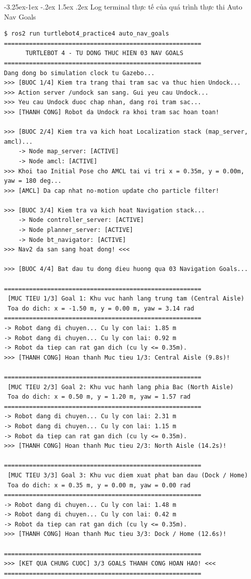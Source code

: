 \documentclass[11pt,a4paper]{article}
\makeatletter
\renewcommand{\subsection}{\@startsection{subsection}{2}{\z@}%
  {-3.25ex\@plus -1ex \@minus -.2ex}%
  {1.5ex \@plus .2ex}%
  {\normalfont\large\bfseries\color{secondary}}}
\makeatother
\begin{document}
\subsection{Log terminal thực tế của quá trình thực thi Auto Nav Goals}
\begin{lstlisting}[backgroundcolor=\color{logbg}, caption={Log terminal thực tế quá trình tự hành qua 03 Navigation Goals}]
$ ros2 run turtlebot4_practice4 auto_nav_goals
=======================================================
      TURTLEBOT 4 - TU DONG THUC HIEN 03 NAV GOALS     
=======================================================
Dang dong bo simulation clock tu Gazebo...
>>> [BUOC 1/4] Kiem tra trang thai tram sac va thuc hien Undock...
>>> Action server /undock san sang. Gui yeu cau Undock...
>>> Yeu cau Undock duoc chap nhan, dang roi tram sac...
>>> [THANH CONG] Robot da Undock ra khoi tram sac hoan toan!

>>> [BUOC 2/4] Kiem tra va kich hoat Localization stack (map_server, amcl)...
    -> Node map_server: [ACTIVE]
    -> Node amcl: [ACTIVE]
>>> Khoi tao Initial Pose cho AMCL tai vi tri x = 0.35m, y = 0.00m, yaw = 180 deg...
>>> [AMCL] Da cap nhat no-motion update cho particle filter!

>>> [BUOC 3/4] Kiem tra va kich hoat Navigation stack...
    -> Node controller_server: [ACTIVE]
    -> Node planner_server: [ACTIVE]
    -> Node bt_navigator: [ACTIVE]
>>> Nav2 da san sang hoat dong! <<<

>>> [BUOC 4/4] Bat dau tu dong dieu huong qua 03 Navigation Goals...

=======================================================
 [MUC TIEU 1/3] Goal 1: Khu vuc hanh lang trung tam (Central Aisle)
 Toa do dich: x = -1.50 m, y = 0.00 m, yaw = 3.14 rad
=======================================================
-> Robot dang di chuyen... Cu ly con lai: 1.85 m
-> Robot dang di chuyen... Cu ly con lai: 0.92 m
-> Robot da tiep can rat gan dich (cu ly <= 0.35m).
>>> [THANH CONG] Hoan thanh Muc tieu 1/3: Central Aisle (9.8s)!

=======================================================
 [MUC TIEU 2/3] Goal 2: Khu vuc hanh lang phia Bac (North Aisle)
 Toa do dich: x = 0.50 m, y = 1.20 m, yaw = 1.57 rad
=======================================================
-> Robot dang di chuyen... Cu ly con lai: 2.31 m
-> Robot dang di chuyen... Cu ly con lai: 1.15 m
-> Robot da tiep can rat gan dich (cu ly <= 0.35m).
>>> [THANH CONG] Hoan thanh Muc tieu 2/3: North Aisle (14.2s)!

=======================================================
 [MUC TIEU 3/3] Goal 3: Khu vuc diem xuat phat ban dau (Dock / Home)
 Toa do dich: x = 0.35 m, y = 0.00 m, yaw = 0.00 rad
=======================================================
-> Robot dang di chuyen... Cu ly con lai: 1.48 m
-> Robot dang di chuyen... Cu ly con lai: 0.42 m
-> Robot da tiep can rat gan dich (cu ly <= 0.35m).
>>> [THANH CONG] Hoan thanh Muc tieu 3/3: Dock / Home (12.6s)!

=======================================================
>>> [KET QUA CHUNG CUOC] 3/3 GOALS THANH CONG HOAN HAO! <<<
=======================================================
\end{lstlisting}
\end{document}
